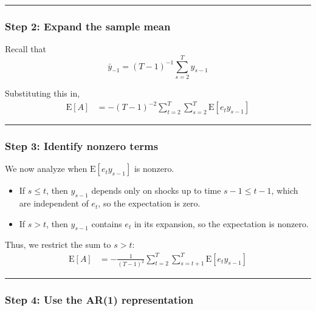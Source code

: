 \documentclass[11pt]{article}
\providecommand{\tightlist}{%
      \setlength{\itemsep}{0pt}\setlength{\parskip}{0pt}}
\begin{document}
\begin{center}\rule{0.5\linewidth}{0.5pt}\end{center}

\subsubsection{Step 2: Expand the sample
mean}\label{step-2-expand-the-sample-mean}

Recall that \[
\bar y_{-1} = (T-1)^{-1}\sum_{s=2}^{T} y_{s-1}
\]

Substituting this in, \[
\begin{aligned}
\text{E}[A]
&= -(T-1)^{-2}\sum_{t=2}^{T}\sum_{s=2}^{T} \text{E}[e_t y_{s-1}]
\end{aligned}
\]

\begin{center}\rule{0.5\linewidth}{0.5pt}\end{center}

\subsubsection{Step 3: Identify nonzero
terms}\label{step-3-identify-nonzero-terms}

We now analyze when \(\text{E}[e_t y_{s-1}]\) is nonzero.

\begin{itemize}
\tightlist
\item
  If \(s \le t\), then \(y_{s-1}\) depends only on shocks up to time
  \(s-1 \le t-1\), which are independent of \(e_t\), so the expectation
  is zero.
\item
  If \(s > t\), then \(y_{s-1}\) contains \(e_t\) in its expansion, so
  the expectation is nonzero.
\end{itemize}

Thus, we restrict the sum to \(s > t\): \[
\begin{aligned}
\text{E}[A]
&= -\frac{1}{(T-1)^2}\sum_{t=2}^{T}\sum_{s=t+1}^{T} \text{E}[e_t y_{s-1}]
\end{aligned}
\]

\begin{center}\rule{0.5\linewidth}{0.5pt}\end{center}

\subsubsection{Step 4: Use the AR(1)
representation}\label{step-4-use-the-ar1-representation}
\end{document}
